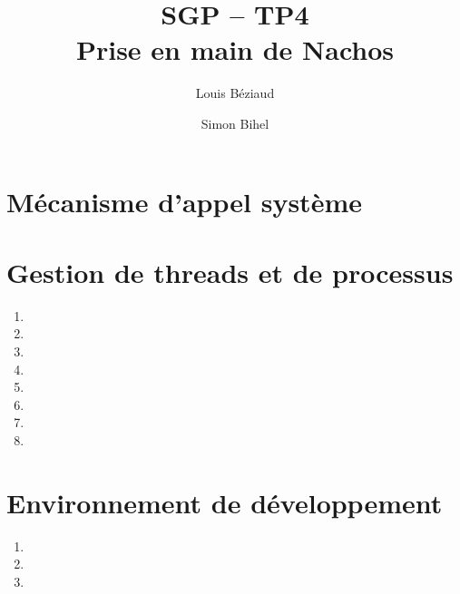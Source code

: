 \documentclass{article}
\title{SGP -- TP4\\Prise en main de Nachos}
\author{Louis Béziaud \and Simon Bihel}
\begin{document}
\maketitle

\section{Mécanisme d'appel système}

\section{Gestion de threads et de processus}

\begin{enumerate}
\item
\item
\item
\item
\item
\item
\item
\item
\end{enumerate}

\section{Environnement de développement}

\begin{enumerate}
\item
\item
\item
\end{enumerate}
\end{document}
